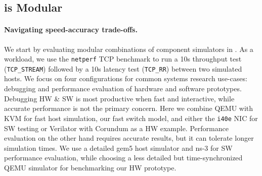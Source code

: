 \subsection{\sysname is Modular}
\label{ssec:eval:compsim}
\paragraph{Navigating speed-accuracy trade-offs.}
We start by evaluating modular combinations of component simulators in
\sysname.
%
As a workload, we use the \texttt{netperf} TCP benchmark to run a 10s
throughput test (\texttt{TCP\_STREAM}) followed by a 10s latency test
(\texttt{TCP\_RR}) between two simulated hosts.
%
We focus on four configurations for common systems research
use-cases: debugging and performance evaluation of hardware and
software prototypes.
%
Debugging HW \& SW is most productive when fast and interactive,
while accurate performance is not the primary concern.
%
Here we combine QEMU with KVM for fast host simulation, our fast
switch model, and either the \texttt{i40e} NIC for SW testing or
Verilator with Corundum as a HW example.
%
Performance evaluation on the other hand requires accurate results, but it can
tolerate longer simulation times.
%
We use a detailed gem5 host simulator and ns-3 for SW performance evaluation,
while choosing a less detailed but time-synchronized QEMU simulator for
benchmarking our HW prototype.



